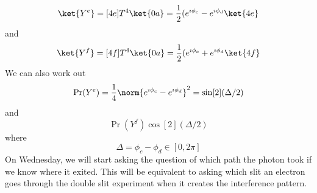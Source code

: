 \documentclass[a4paper,twoside,master.tex]{subfiles}
\begin{document}
\begin{equation}
    \ket{Y^e} = [4e]T^4\ket{0a} = \frac{1}{2} (e^{\imath\phi_c} - e^{\imath\phi_d}\ket{4e}
\end{equation}
and
\begin{equation}
    \ket{Y^f} = [4f]T^4\ket{0a} = \frac{1}{2} (e^{\imath\phi_c} + e^{\imath\phi_d}\ket{4f}
\end{equation}
We can also work out
\begin{equation}
    \Pr(Y^e) = \frac{1}{4} \norm{e^{\imath\phi_c} - e^{\imath\phi_d}}^2 = \sin[2](\Delta/2)
\end{equation}
and
\begin{equation}
    \Pr(Y^f) \cos[2](\Delta/2)
\end{equation}
where
\begin{equation}
    \Delta = \phi_c - \phi_d \in [0, 2\pi]
\end{equation}
On Wednesday, we will start asking the question of which path the photon took if we know where it exited. This will be equivalent to asking which slit an electron goes through the double slit experiment when it creates the interference pattern.
\end{document}
